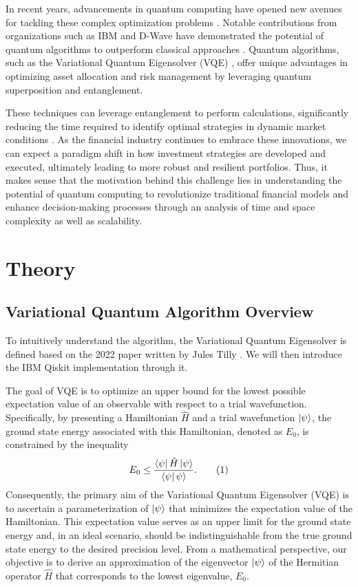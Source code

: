 \documentclass[%
 reprint,
 amsmath,amssymb,
 aps,
]{revtex4-2}
\begin{document}
In recent years, advancements in quantum computing have opened new avenues for tackling these complex optimization problems \cite{Moll2018}. Notable contributions from organizations such as IBM and D-Wave have demonstrated the potential of quantum algorithms to outperform classical approaches \cite{Hodson2019}. Quantum algorithms, such as the Variational Quantum Eigensolver (VQE) \cite{Peruzzo2014, McClean2016}, offer unique advantages in optimizing asset allocation and risk management by leveraging quantum superposition and entanglement.

These techniques can leverage entanglement to perform calculations, significantly reducing the time required to identify optimal strategies in dynamic market conditions \cite{Cerezo2021}. As the financial industry continues to embrace these innovations, we can expect a paradigm shift in how investment strategies are developed and executed, ultimately leading to more robust and resilient portfolios. Thus, it makes sense that the motivation behind this challenge lies in understanding the potential of quantum computing to revolutionize traditional financial models and enhance decision-making processes through an analysis of time and space complexity as well as scalability.
\section{Theory}
\subsection{Variational Quantum Algorithm Overview}

To intuitively understand the algorithm, the Variational Quantum Eigensolver is defined based on the 2022 paper written by Jules Tilly \cite{Tilly2022}. We will then introduce the IBM Qiskit implementation through it.

The goal of VQE is to optimize an upper bound for the lowest possible expectation value of an observable with respect to a trial wavefunction. Specifically, by presenting a Hamiltonian $\hat{H}$ and a trial wavefunction $\ket{\psi}$, the ground state energy associated with this Hamiltonian, denoted as $E_0$, is constrained by the inequality 
\[
E_0 \leq \frac{\bra{\psi}\hat{H}\ket{\psi}}{\bra{\psi}\psi\rangle}. 
\tag{1}
\]
Consequently, the primary aim of the Variational Quantum Eigensolver (VQE) is to ascertain a parameterization of $\ket{\psi}$ that minimizes the expectation value of the Hamiltonian. This expectation value serves as an upper limit for the ground state energy and, in an ideal scenario, should be indistinguishable from the true ground state energy to the desired precision level. From a mathematical perspective, our objective is to derive an approximation of the eigenvector $\ket{\psi}$ of the Hermitian operator $\hat{H}$ that corresponds to the lowest eigenvalue, $E_0$. 
\end{document}
